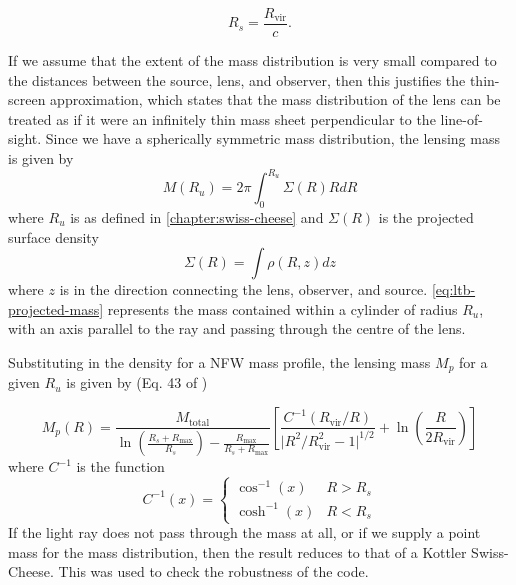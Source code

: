 \begin{equation}
  R_s = \frac{R_{\text{vir}}}{c}.
\end{equation}

If we assume that the extent of the mass distribution is very small compared to the distances between the source, lens, and observer, then this justifies the thin-screen approximation, which states that the mass distribution of the lens can be treated as if it were an infinitely thin mass sheet perpendicular to the line-of-sight. Since we have a spherically symmetric mass distribution, the lensing mass is given by
\begin{equation}
  M(R_u) = 2\pi \int_0^{R_u} \Sigma(R) R dR
  \label{eq:ltb-projected-mass}
\end{equation}
where $R_u$ is as defined in \autoref{chapter:swiss-cheese} and $\Sigma(R)$ is the projected surface density
\begin{equation}
  \Sigma(R) = \int \rho(R, z) dz 
  \label{eq:ltb-projected-surface-density}
\end{equation}
where $z$ is in the direction connecting the lens, observer, and source. \autoref{eq:ltb-projected-mass} represents the mass contained within a cylinder of radius $R_u$, with an axis parallel to the ray and passing through the centre of the lens. 

Substituting in the density for a NFW mass profile, the lensing mass $M_p$ for a given $R_u$ is given by (Eq. 43 of \citet{lokas2001properties})

\begin{equation}
  M_p(R) = \frac{M_{\text{total}}}{\ln\left ( \frac{R_s + R_{\text{max}}}{R_s}\right) - \frac{R_{\text{max}}}{R_s + R_{\text{max}}}} \left [\frac{C^{-1}(R_{\text{vir}}/R)}{\mathopen| R^2/R_{\text{vir}}^2 - 1 \mathclose|^{1/2}} + \ln \left ( \frac{R}{2 R_{\text{vir}}}\right ) \right ]
\end{equation}
where $C^{-1}$ is the function
\begin{equation}
  C^{-1}(x) = 
  \begin{cases}
    \cos^{-1}(x)  & R > R_s\\
    \cosh^{-1}(x) & R < R_s
  \end{cases}
\end{equation}
If the light ray does not pass through the mass at all, or if we supply a point mass for the mass distribution, then the result reduces to that of a Kottler Swiss-Cheese. This was used to check the robustness of the code. 

